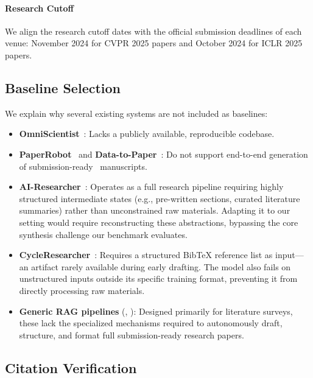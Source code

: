 \paragraph{Research Cutoff} We align the research cutoff dates with the official submission deadlines of each venue: November 2024 for CVPR 2025 papers and October 2024 for ICLR 2025 papers.


\subsection{Baseline Selection}
\label{appendix:baseline_selection}

We explain why several existing systems are not included as baselines:

\begin{itemize}
    \item \textbf{OmniScientist}~\citep{shao2025omniscientist}: Lacks a publicly available, reproducible codebase.
    \item \textbf{PaperRobot}~\citep{wang2019paperrobot} and \textbf{Data-to-Paper}~\citep{technion2024datatopaper}: Do not support end-to-end generation of submission-ready \mylatex\ manuscripts.
    \item \textbf{AI-Researcher}~\citep{tang2025ai}: Operates as a full research pipeline requiring highly structured intermediate states (e.g., pre-written sections, curated literature summaries) rather than unconstrained raw materials. Adapting it to our setting would require reconstructing these abstractions, bypassing the core synthesis challenge our benchmark evaluates.
    \item \textbf{CycleResearcher}~\citep{weng2024cycleresearcher}: Requires a structured BibTeX reference list as input—an artifact rarely available during early drafting. The model also fails on unstructured inputs outside its specific training format, preventing it from directly processing raw materials.
    \item \textbf{Generic RAG pipelines} (\citep{wu2025autosurvey2}, \citep{go2025lira}): Designed primarily for literature surveys, these lack the specialized mechanisms required to autonomously draft, structure, and format full submission-ready research papers.
\end{itemize}

\subsection{Citation Verification}
\label{appendix:citation_verification}

